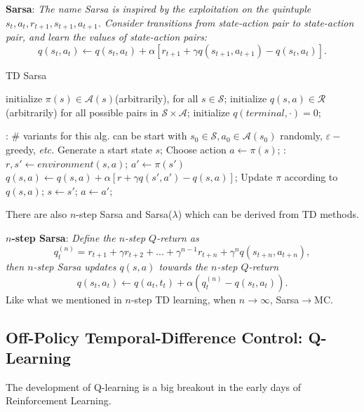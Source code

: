 \documentclass{progartcn}
\begin{document}
			\textbf{Sarsa}: \textit{The name Sarsa is inspired by the exploitation on the quintuple $s_t,a_t,r_{t+1},s_{t+1},a_{t+1}$. Consider transitions from state-action pair to state-action pair, and learn the values of state-action pairs:}
			\[q(s_t,a_t)\gets q(s_t,a_t)+\alpha[r_{t+1}+\gamma q(s_{t+1},a_{t+1})-q(s_t,a_t)].\]

			\begin{algorithm}[h]
			\caption{TD Sarsa}
			\label{alg: TD Sarsa}
			\begin{algorithmic}[1]
			\State initialize $\pi(s)\in \mathcal{A}(s)$(arbitrarily), for all $s\in \mathcal{S}$; initialize $q(s,a)\in\mathcal{R}$(arbitrarily) for all possible pairs in $\mathcal{S}\times\mathcal{A}$; initialize $q(terminal,\cdot)=0$;
	        
            :
            	\Statex \# variants for this alg. can be start with $s_0\in\mathcal{S},a_0\in\mathcal{A}(s_0)$ randomly, $\varepsilon-$greedy, \textit{etc.}
            	\State Generate a start state $s$;
            	\State Choose action $a\gets\pi(s)$;
            	:
            		\State $r,s'\gets environment(s,a)$;
            		\State $a'\gets \pi(s')$
            		\State $q(s,a)\gets q(s,a)+\alpha[r+\gamma q(s',a')-q(s,a)]$;
            		\State Update $\pi$ according to $q(s,a)$;
            		\State $s\gets s'$;
            		\State $a\gets a'$;
            	\EndWhile
            \EndFor
	        \end{algorithmic}
	        \end{algorithm}

			There are also $n$-step Sarsa and Sarsa($\lambda$) which can be derived from TD methods.

            \textbf{$n$-step Sarsa}: \textit{Define the $n$-step $Q$-return as}
            	\[q^{(n)}_t=r_{t+1}+\gamma r_{t+2}+...+\gamma^{n-1}r_{t+n}+\gamma^n q(s_{t+n},a_{t+n}),\]
            \textit{then $n$-step Sarsa updates $q(s,a)$ towards the $n$-step $Q$-return}
            	\[q(s_t,a_t)\gets q(a_t,t_t)+\alpha (q_t^{(n)}-q(s_t,a_t)).\]
            Like what we mentioned in $n$-step TD learning, when $n\to\infty$, Sarsa$\to$MC.\\

	\subsection{Off-Policy Temporal-Difference Control: Q-Learning}

			The development of Q-learning is a big breakout in the early days of Reinforcement Learning.
\end{document}
